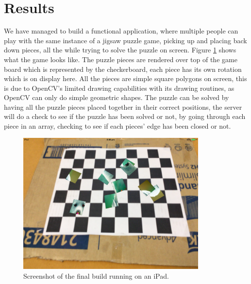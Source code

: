 \documentclass{article}
\begin{document}

\section{Results}

We have managed to build a functional application, where multiple people can
play with the same instance of a jigsaw puzzle game, picking up and placing back
down pieces, all the while trying to solve the puzzle on screen. Figure
\ref{fig:iPadFinal} shows what the game looks like. The puzzle pieces are
rendered over top of the game board which is represented by the checkerboard,
each piece has its own rotation which is on display here. All the pieces are
simple square polygons on screen, this is due to OpenCV's limited drawing
capabilities with its drawing routines, as OpenCV can only do simple geometric
shapes. The puzzle can be solved by having all the puzzle pieces placed together
in their correct positions, the server will do a check to see if the puzzle has
been solved or not, by going through each piece in an array, checking to see if
each pieces' edge has been closed or not.

\begin{figure}[ht]
\begin{center}
\includegraphics[width=0.85\textwidth]{images/iPadFinalImage}
\caption{Screenshot of the final build running on an iPad.}
\label{fig:iPadFinal}
\end{center}
\end{figure}

\end{document}
